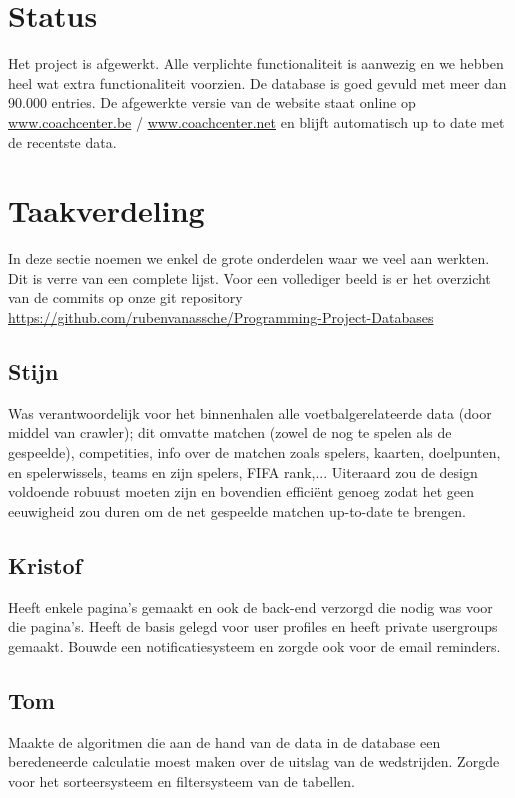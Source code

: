 \documentclass[11pt, a4paper]{article}
\begin{document}
\title{}
\author{Groep A\\ Eindrapport}
\date{27 mei 2014}
\maketitle

\section{Status}
Het project is afgewerkt. Alle verplichte functionaliteit is aanwezig en we hebben heel wat extra functionaliteit voorzien. De database is goed gevuld met meer dan 90.000 entries. De afgewerkte versie van de website staat online op \url{www.coachcenter.be} / \url{www.coachcenter.net} en blijft automatisch up to date met de recentste data.
\section{Taakverdeling}
In deze sectie noemen we enkel de grote onderdelen waar we veel aan werkten. Dit is verre van een complete lijst. Voor een vollediger beeld is er het overzicht van de commits op onze git repository \\ \url{https://github.com/rubenvanassche/Programming-Project-Databases}
\subsection{Stijn}
Was verantwoordelijk voor het binnenhalen alle voetbalgerelateerde data (door middel van crawler); dit omvatte matchen (zowel de nog te spelen als de gespeelde), competities, info over de matchen zoals spelers, kaarten, doelpunten, en spelerwissels, teams en zijn spelers, FIFA rank,... Uiteraard zou de design voldoende robuust moeten zijn en bovendien effici\"ent genoeg zodat het geen eeuwigheid zou duren om de net gespeelde matchen up-to-date te brengen.
\subsection{Kristof}
Heeft enkele pagina's gemaakt en ook de back-end verzorgd die nodig was voor die pagina's. Heeft de basis gelegd voor user profiles en heeft private usergroups gemaakt. Bouwde een notificatiesysteem en zorgde ook voor de email reminders.
\subsection{Tom}
Maakte de algoritmen die aan de hand van de data in de database een beredeneerde calculatie moest maken over de uitslag van de wedstrijden.
Zorgde voor het sorteersysteem en filtersysteem van de tabellen.
\end{document}
